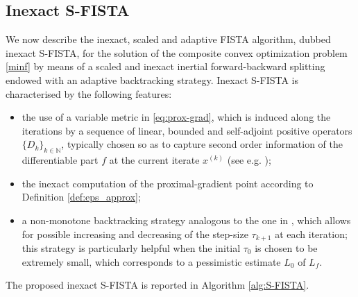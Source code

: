 \documentclass[conference]{IEEEtran}
\begin{document}
\subsection{Inexact S-FISTA}
We now describe the inexact, scaled and adaptive FISTA algorithm, dubbed inexact S-FISTA, for the solution of the composite convex optimization problem \eqref{minf} by means of a scaled and inexact inertial forward-backward splitting endowed with an adaptive backtracking strategy. Inexact S-FISTA is characterised by the following features:
\begin{itemize}
    \item the use of a variable metric in  \eqref{eq:prox-grad}, which is induced along the iterations by a sequence of linear, bounded and self-adjoint positive operators $\{D_k\}_{k\in\mathbb{N}}$, typically chosen so as to capture second order information of the differentiable part $f$ at the current iterate $x^{(k)}$ (see e.g. \cite{Bonettini-etal-2009,Bonettini2018a,Bonettini2019,Lanteri-etal-2001});  
    \item the inexact computation of the proximal-gradient point according to Definition \ref{def:eps_approx};
    \item a non-monotone backtracking strategy analogous to the one in \cite{Calatroni-Chambolle-2019}, which allows for possible increasing and decreasing of the step-size $\tau_{k+1}$ at each iteration; this strategy is  particularly helpful when the initial $\tau_0$ is chosen to be extremely small, which corresponds to a pessimistic estimate $L_0$ of $L_f$.
\end{itemize}
The proposed inexact S-FISTA is reported in Algorithm \ref{alg:S-FISTA}.
\end{document}
